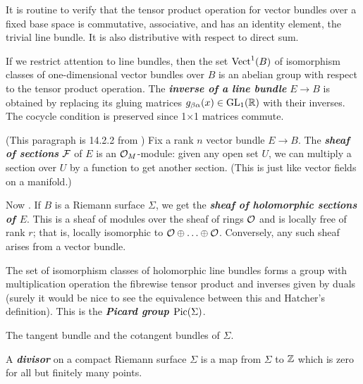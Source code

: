 \begin{prop}
	It is routine to verify that the tensor product operation for vector bundles over a fixed base space is commutative, associative, and has an identity element, the trivial line bundle. It is also distributive with respect to direct sum.
\end{prop}
\begin{defn}
	If we restrict attention to line bundles, then the set $\operatorname{Vect}^1(B)$ of isomorphism classes of one-dimensional vector bundles over $B$ is an abelian group with respect to the tensor product operation. The \textbf{\textit{inverse of a line bundle}} $E\to B$ is obtained by replacing its gluing matrices $g_{\beta\alpha}(x)\in\operatorname{GL}_1(\mathbb{R})$ with their inverses. The cocycle condition is preserved since 1×1 matrices commute.
\end{defn}

\begin{remark}
	(This paragraph is 14.2.2 from \cite{the-rising-sea}) Fix a rank $n$ vector bundle $E\to B$. The \textbf{\textit{sheaf of sections}} $\mathcal{F}$ of $E$ is an $\mathcal{O}_M$-module: given any open set $U$, we can multiply a section over $U$ by a function to get another section. {\color{cyan}(This is just like vector fields on a manifold.)}
	
	Now \cite{donaldson}. If $B$ is a Riemann surface $\Sigma$, we get the \textbf{\textit{sheaf of holomorphic sections of $E$}}. This is a sheaf of modules over the sheaf of rings $\mathcal{O}$ and is locally free of rank $r$; that is, locally isomorphic to $\mathcal{O}\oplus\ldots\oplus\mathcal{O}$. Conversely, any such sheaf arises from a vector bundle.
\end{remark}
\begin{defn}
	The set of isomorphism classes of holomorphic line bundles forms a group with multiplication operation the fibrewise tensor product and {\color{magenta}inverses given by duals (surely it would be nice to see the equivalence between this and Hatcher's definition)}. This is the \textbf{\textit{Picard group $\operatorname{Pic}(\Sigma)$}}.
\end{defn}
\begin{example}
	The tangent bundle and the cotangent bundles of $\Sigma$.
\end{example}
\begin{defn}
	A \textbf{\textit{divisor}} on a compact Riemann surface $\Sigma$ is a map from $\Sigma$ to $\mathbb{Z}$ which is zero for all but finitely many points.
\end{defn}
	
